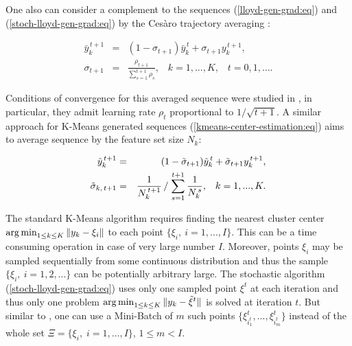One also can consider a complement to the sequences (\ref{lloyd-gen-grad:eq}) and (\ref{stoch-lloyd-gen-grad:eq}) by the Ces\`aro trajectory averaging \cite{Bottou_Curtis_Nocedal_2018,montavon2012neural}:

\begin{eqnarray}
    \label{kmeans-trajectory-avg:eq}
        \bar{y}_k^{\,t+1} &=& (1 - \sigma_{t+1}) \bar{y}_k^{\,t} + \sigma_{t+1} y_k^{\,t+1}, \nonumber \\
        \sigma_{t+1} &=& \frac{\rho_{t+1}}{\sum_{s=1}^{t+1} \rho_{s}}, \;\;\; k = 1, ..., K, \;\;\;t=0,1,\ldots.
\end{eqnarray}

Conditions of convergence for this averaged sequence were studied in \cite{mikhalevich2024}, in particular, they admit learning rate $ \rho_t $ proportional to $ 1 / \sqrt{t+1} $. A similar approach for K-Means generated sequences (\ref{kmeans-center-estimation:eq}) aims to average sequence by the feature set size $ N_k $:

\begin{eqnarray}
    \label{kmeans-trajectory-avg-alt:eq}
        \tilde{y}_k^{\,t+1} &=& (1 - \tilde{\sigma}_{t+1}) \tilde{y}_k^{\,t} + \tilde{\sigma}_{t+1} y_k^{\,t+1}, \nonumber \\
        \tilde{\sigma}_{k, \,t+1} &=& \frac{1}{N_k^{\,t+1}} \left/\right. \sum_{s=1}^{t+1} \frac{1}{N_k^{\,s}}, \;\;\; k = 1, ..., K.
\end{eqnarray}

The standard K-Means algorithm requires finding the nearest cluster center $ \operatorname*{arg\,min}_{1 \leq k \leq K} \| y_k - \xi_i \| $ to each point $ \{ \xi_i, \> i = 1, ..., I \} $. This can be a time consuming operation in case of very large number $ I $. Moreover, points $ \xi_i $ may be sampled sequentially from some continuous distribution and thus the sample $ \{ \xi_i, \> i = 1, 2, ... \} $ can be potentially arbitrary large. The stochastic algorithm (\ref{stoch-lloyd-gen-grad:eq}) uses only one sampled point $ {\xi}^t $ at each iteration and thus only one problem $ \operatorname*{arg\,min}_{1 \leq k \leq K} \| y_k - \tilde{\xi}^t \| $ is solved at iteration $ t $. But similar to \cite{Sculley_2010}, one can use a Mini-Batch of $ m $ such points $ \{ {\xi}^t_{i_1^t}, ..., {\xi}^t_{i_m^t} \} $ instead of the whole set $\Xi= \{ \xi_i,\;i=1,\ldots,I \} $, $ 1\leq m < I $.
